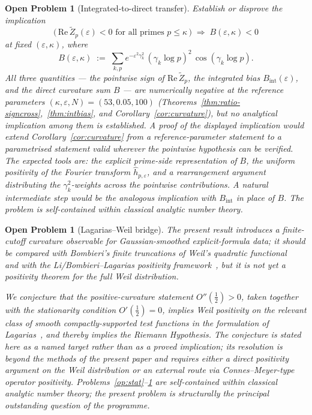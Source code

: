 \documentclass[11pt]{article}
\newtheorem{openproblem}[theorem]{Open Problem}
\newcommand{\Zt}{\widetilde{Z}}
\begin{document}
\begin{openproblem}[Integrated-to-direct transfer]
\label{op:transfer}
Establish or disprove the implication
\[
\bigl(\,\mathrm{Re}\,\Zt_p(\varepsilon)<0 \text{ for all primes }
p\le\kappa\,\bigr)
\;\Longrightarrow\;
B(\varepsilon,\kappa)<0
\]
at fixed $(\varepsilon,\kappa)$, where
\[
B(\varepsilon,\kappa) \;:=\; \sum_{k,p} e^{-\varepsilon^2\gamma_k^2}\,
(\gamma_k\log p)^2\,\cos(\gamma_k\log p).
\]
All three quantities --- the pointwise sign of
$\mathrm{Re}\,\Zt_p$, the integrated bias $B_{\mathrm{int}}(\varepsilon)$,
and the direct curvature sum $B$ --- are numerically negative at the
reference parameters $(\kappa,\varepsilon,N)=(53,0.05,100)$
(Theorems~\ref{thm:ratio-signcross},~\ref{thm:intbias}, and
Corollary~\ref{cor:curvature}), but no analytical implication among
them is established.
A proof of the displayed implication would extend
Corollary~\ref{cor:curvature} from a reference-parameter statement to
a parametrised statement valid wherever the pointwise hypothesis can
be verified.
The expected tools are: the explicit prime-side representation of $B$,
the uniform positivity of the Fourier transform
$\widehat{h}_{p,\varepsilon}$, and a rearrangement argument
distributing the $\gamma_k^2$-weights across the pointwise
contributions.
A natural intermediate step would be the analogous implication with
$B_{\mathrm{int}}$ in place of $B$.
The problem is self-contained within classical analytic number theory.
\end{openproblem}

\begin{openproblem}[Lagarias--Weil bridge]
\label{op:weil-bridge}
The present result introduces a finite-cutoff curvature observable
for Gaussian-smoothed explicit-formula data; it should be compared
with Bombieri's finite truncations of Weil's quadratic
functional~\cite{Bombieri} and with the Li/Bombieri--Lagarias
positivity framework~\cite{Li,BombieriLagarias}, but it is not yet a
positivity theorem for the full Weil distribution.

We conjecture that the positive-curvature statement
$O''(\tfrac12)>0$, taken together with the stationarity condition
$O'(\tfrac12)=0$, implies Weil positivity on the relevant class of
smooth compactly-supported test functions in the formulation of
Lagarias~\cite{Lagarias}, and thereby implies the Riemann Hypothesis.
The conjecture is stated here as a named target rather than as a
proved implication; its resolution is beyond the methods of the
present paper and requires either a direct positivity argument on the
Weil distribution or an external route via Connes--Meyer-type operator
positivity.
Problems~\ref{op:stat}--\ref{op:transfer} are self-contained within
classical analytic number theory; the present problem is structurally
the principal outstanding question of the programme.
\end{openproblem}
\end{document}
